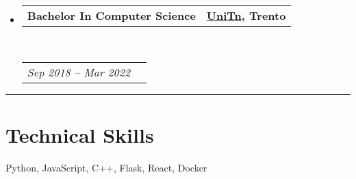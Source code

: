 \documentclass[10pt,a4paper,hidelinks]{article}
\makeatletter
\newenvironment{indentsection}[1]%
{\begin{list}{}%
	{\setlength{\leftmargin}{#1}}%
	\item[]%
}
{\end{list}}
\newcommand{\headerrow}[2]
{\begin{tabular*}{\linewidth}{l@{\extracolsep{\fill}}r}
	#1 &
	#2 \\
\end{tabular*}}
\makeatother
\begin{document}
\begin{itemize}
	\parskip=0.1em

	\item 
	\headerrow
		{\textbf{Bachelor In Computer Science}}
		{\textbf{\colorbox{IFLightGreen!30}{\href{https://www.unitn.it/}{\textbf{UniTn}}}{, Trento}}}
	\\
	\headerrow
		{\emph{Sep 2018 -- Mar 2022}}
		{\emph{}}

\end{itemize}




%
%
%	
%




{\color{IFMediumGreen} \hrule}
\vspace{-0.3em}
{\color{IFDarkGreen}\section*{Technical Skills}}

\begin{indentsection}{\parindent}
\begin{description*}
    Python, JavaScript, C++, Flask, React, Docker
\end{description*}
\end{indentsection}
\end{document}
